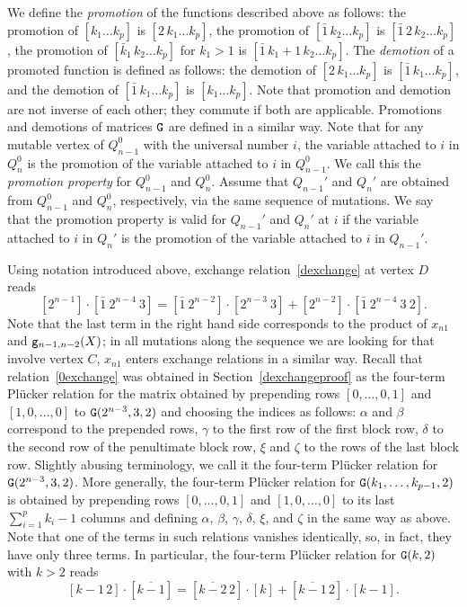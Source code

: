 \documentclass{amsart}
\theoremstyle{definition}
\theoremstyle{remark}
\numberwithin{equation}{section}
\numberwithin{theorem}{section}
\def\NG{{\tt G}}
\def\Ws{\mathbf W}
\def\eg{{\tt g}}
\begin{document}
We define the {\it promotion\/} 
of the functions described above as follows: the promotion of  $[k_1\ldots k_p]$ is $[2\, k_1\ldots k_p]$, 
the promotion of  $[\bar1\, k_2\ldots k_p]$ is $[\bar1\,2\, k_2\ldots k_p]$, 
the promotion of $[\bar k_1\, k_2\ldots k_p]$ for $k_1>1$ is $[\bar 1\, k_1+1\,k_2\ldots k_p]$.  
The {\it demotion\/} of a promoted function is defined as follows: the demotion of $[2\, k_1\ldots k_p]$ is
$[\bar1\, k_1\ldots k_p]$, and the demotion of $[\bar1\, k_1\ldots k_p]$ is  $[k_1\ldots k_p]$. Note that promotion and demotion are not inverse of each other; they commute if both are applicable.
Promotions and demotions of matrices $\NG$ are defined in a similar way.
Note that for any mutable vertex of $Q_{n-1}^0$ with the universal number $i$, the variable attached to $i$ in
$Q_n^0$ is the promotion of the variable  attached to $i$ in $Q_{n-1}^0$. We call this the {\it promotion property\/}
for  $Q_{n-1}^0$ and $Q_n^0$. Assume that $Q_{n-1}'$ and $Q_n'$ are obtained from $Q_{n-1}^0$ and $Q_n^0$, respectively, via the same sequence of mutations. We say that the promotion property is valid for $Q_{n-1}'$ and $Q_n'$ at $i$ if the variable attached to $i$ in $Q_n'$ is the promotion of the variable attached to $i$ in $Q_{n-1}'$. 

Using notation introduced above, exchange relation~\eqref{dexchange} at vertex $D$ reads
\begin{equation}\label{0exchange}
[2^{n-1}]\cdot[\bar 1\ 2^{n-4}\ 3]=
[\bar 1\ 2^{n-2}]\cdot [2^{n-3}\ 3]+[2^{n-2}]\cdot[\bar 1\ 2^{n-4}\ 3\ 2].
\end{equation}
 Note that the last term in the right hand side corresponds to the product of $x_{n1}$ and $\eg_{n-1,n-2}(X)$; in all mutations along the sequence %
we are looking for that involve vertex $C$, $x_{n1}$ enters exchange relations in a similar way.
Recall that relation~\eqref{0exchange} was obtained in Section~\ref{dexchangeproof} as the four-term Pl\"ucker relation for the matrix obtained by prepending rows $[0,\dots,0,1]$ and $[1, 0,\dots,0]$ to $\NG(2^{n-3},3,2)$ and choosing 
the indices as follows: $\alpha$ and $\beta$ correspond to the prepended rows, $\gamma$ to the first row of the first block row, $\delta$ to the second row of the penultimate block row, $\xi$ and $\zeta$ to the rows of the last block row. Slightly abusing terminology, we call it the four-term Pl\"ucker relation for $\NG(2^{n-3},3,2)$.
More generally, the four-term Pl\"ucker relation for $\NG(k_1,\dots,k_{p-1},2)$ is obtained by prepending rows 
$[0,\dots,0,1]$ and $[1, 0,\dots,0]$ to its last $\sum_{i=1}^p k_i-1$ columns and defining $\alpha$, $\beta$, $\gamma$, 
$\delta$, $\xi$, and $\zeta$ in the same way as above. Note that one of the terms in such relations vanishes identically, so, in fact, they have only three terms. In particular, the four-term Pl\"ucker relation for 
$\NG(k,2)$ with $k>2$ reads
\begin{equation}\label{4pluck}
[k-1\,2]\cdot[\overline{k-1}]=[\overline{k-2}\,2]\cdot[k]+[\overline{k-1}\,2]\cdot[k-1].
\end{equation}
\end{document}
